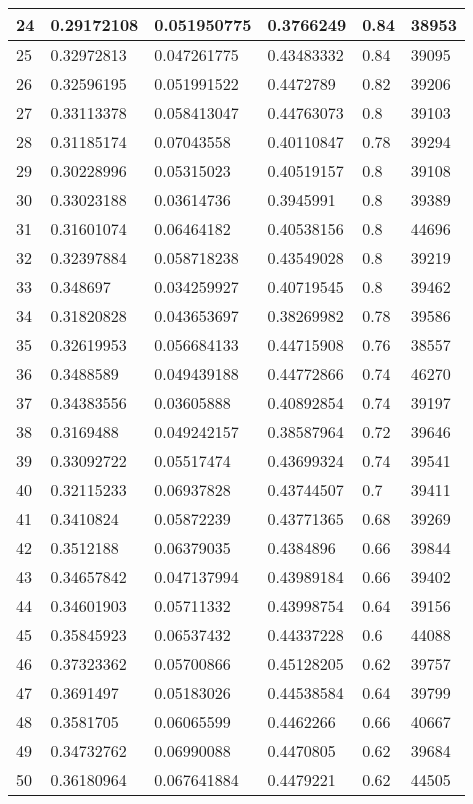 \begin{longtable}{|l|l|l|l|l|l|}
24 & 0.29172108 & 0.051950775 & 0.3766249 & 0.84 & 38953 \\ \hline 
25 & 0.32972813 & 0.047261775 & 0.43483332 & 0.84 & 39095 \\ \hline 
26 & 0.32596195 & 0.051991522 & 0.4472789 & 0.82 & 39206 \\ \hline 
27 & 0.33113378 & 0.058413047 & 0.44763073 & 0.8 & 39103 \\ \hline 
28 & 0.31185174 & 0.07043558 & 0.40110847 & 0.78 & 39294 \\ \hline 
29 & 0.30228996 & 0.05315023 & 0.40519157 & 0.8 & 39108 \\ \hline 
30 & 0.33023188 & 0.03614736 & 0.3945991 & 0.8 & 39389 \\ \hline 
31 & 0.31601074 & 0.06464182 & 0.40538156 & 0.8 & 44696 \\ \hline 
32 & 0.32397884 & 0.058718238 & 0.43549028 & 0.8 & 39219 \\ \hline 
33 & 0.348697 & 0.034259927 & 0.40719545 & 0.8 & 39462 \\ \hline 
34 & 0.31820828 & 0.043653697 & 0.38269982 & 0.78 & 39586 \\ \hline 
35 & 0.32619953 & 0.056684133 & 0.44715908 & 0.76 & 38557 \\ \hline 
36 & 0.3488589 & 0.049439188 & 0.44772866 & 0.74 & 46270 \\ \hline 
37 & 0.34383556 & 0.03605888 & 0.40892854 & 0.74 & 39197 \\ \hline 
38 & 0.3169488 & 0.049242157 & 0.38587964 & 0.72 & 39646 \\ \hline 
39 & 0.33092722 & 0.05517474 & 0.43699324 & 0.74 & 39541 \\ \hline 
40 & 0.32115233 & 0.06937828 & 0.43744507 & 0.7 & 39411 \\ \hline 
41 & 0.3410824 & 0.05872239 & 0.43771365 & 0.68 & 39269 \\ \hline 
42 & 0.3512188 & 0.06379035 & 0.4384896 & 0.66 & 39844 \\ \hline 
43 & 0.34657842 & 0.047137994 & 0.43989184 & 0.66 & 39402 \\ \hline 
44 & 0.34601903 & 0.05711332 & 0.43998754 & 0.64 & 39156 \\ \hline 
45 & 0.35845923 & 0.06537432 & 0.44337228 & 0.6 & 44088 \\ \hline 
46 & 0.37323362 & 0.05700866 & 0.45128205 & 0.62 & 39757 \\ \hline 
47 & 0.3691497 & 0.05183026 & 0.44538584 & 0.64 & 39799 \\ \hline 
48 & 0.3581705 & 0.06065599 & 0.4462266 & 0.66 & 40667 \\ \hline 
49 & 0.34732762 & 0.06990088 & 0.4470805 & 0.62 & 39684 \\ \hline 
50 & 0.36180964 & 0.067641884 & 0.4479221 & 0.62 & 44505 \\ \hline 
\end{longtable}